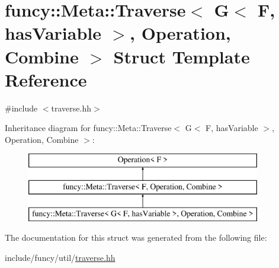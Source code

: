 \hypertarget{structfuncy_1_1Meta_1_1Traverse_3_01G_3_01F_00_01hasVariable_01_4_00_01Operation_00_01Combine_01_4}{\section{funcy\-:\-:Meta\-:\-:Traverse$<$ G$<$ F, has\-Variable $>$, Operation, Combine $>$ Struct Template Reference}
\label{structfuncy_1_1Meta_1_1Traverse_3_01G_3_01F_00_01hasVariable_01_4_00_01Operation_00_01Combine_01_4}
}


{\ttfamily \#include $<$traverse.\-hh$>$}

Inheritance diagram for funcy\-:\-:Meta\-:\-:Traverse$<$ G$<$ F, has\-Variable $>$, Operation, Combine $>$\-:\begin{figure}[H]
\begin{center}
\leavevmode
\includegraphics[height=3.000000cm]{structfuncy_1_1Meta_1_1Traverse_3_01G_3_01F_00_01hasVariable_01_4_00_01Operation_00_01Combine_01_4}
\end{center}
\end{figure}


The documentation for this struct was generated from the following file\-:\begin{DoxyCompactItemize}
\item 
include/funcy/util/\hyperlink{traverse_8hh}{traverse.\-hh}\end{DoxyCompactItemize}
